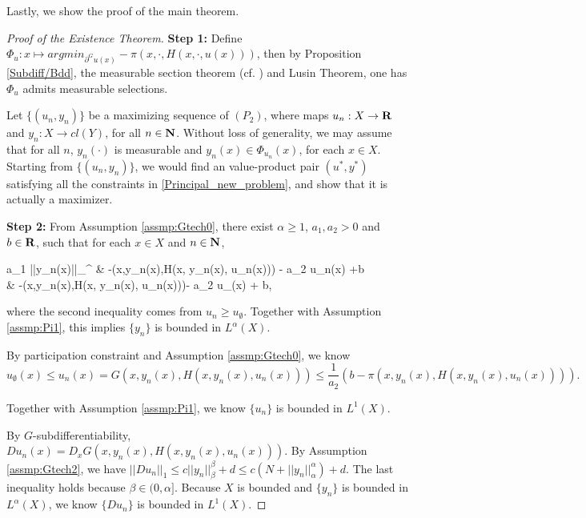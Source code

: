 Lastly, we show the proof of the main theorem.\medskip

\begin{proof}[Proof of the Existence Theorem]
	{\bf Step 1:} 	 Define $\Phi_u: x \longmapsto argmin_{\partial^G u(x)} -\pi(x, \cdot, H(x,\cdot,u(x)))$, then by Proposition \ref{Subdiff/Bdd}, the measurable section theorem (cf. \cite[Theorem 1.2, Chapter VIII]{EkelandTemam76}) and Lusin Theorem, one has $\Phi_u$ admits measurable selections. \medskip
	
	Let $\{(u_n, y_n)\}$ be a maximizing sequence of $(P_2)$, where maps $u_n: X\rightarrow {\mathbf R}$ and $y_n: X\rightarrow cl(Y)$, for all $n\in \mathbf{N}$. Without loss of generality, we may assume that for all $n$, $y_n(\cdot)$ is measurable and $y_n(x) \in \Phi_{u_n}(x)$, for each $x\in X$. Starting from $\{(u_n, y_n)\}$, we would find an value-product pair $(u^*, y^*)$ satisfying all the constraints in \eqref{Principal_new_problem}, and show that it is actually a maximizer.\medskip
	
	{\bf Step 2:} From Assumption \ref{assmp:Gtech0}, there exist $\alpha \ge 1$, $a_1, a_2> 0$ and $b\in {\mathbf R}$,  such that for each $x\in X$ and $n \in \mathbf{N}$,
	\begin{flalign*}
	a_1 ||y_n(x)||_{\alpha}^{\alpha} \le & -\pi(x,y_n(x),H(x, y_n(x), u_n(x))) - a_2 u_n(x) +b \\
	\le &  -\pi(x,y_n(x),H(x, y_n(x), u_n(x)))- a_2 u_{\emptyset}(x) + b,
	\end{flalign*}
	where the second inequality comes from $u_n\ge u_{\emptyset}$. Together with Assumption \ref{assmp:Pi1}, this implies $\{y_n\}$ is bounded in $L^{\alpha}(X)$.\medskip
	

	By participation constraint and Assumption \ref{assmp:Gtech0}, we know 
	\begin{equation*}
	u_{\emptyset}(x) \le u_n(x) = G(x,y_n(x),H(x,y_n(x),u_n(x))) \le \frac{1}{a_2}(b - \pi(x,y_n(x),H(x,y_n(x),u_n(x)))).
	\end{equation*}

	Together with Assumption \ref{assmp:Pi1}, we know $\{u_n\}$ is bounded in $L^1(X)$.\medskip

	By $G$-subdifferentiability, $Du_n(x) = D_x G(x, y_n(x), H(x,y_n(x),u_n(x)))$. By Assumption \ref{assmp:Gtech2}, we have $||Du_n||_{1}\le c||y_n||_{\beta}^{\beta}+d \le c(N+||y_n||_{\alpha}^{\alpha})+d$. The last inequality holds because $\beta \in (0, \alpha]$. Because $X$ is bounded and $\{y_n\}$ is bounded in $L^{\alpha}(X)$, we know $\{Du_n\}$ is bounded in $L^1(X)$.\medskip
	

\end{proof}
